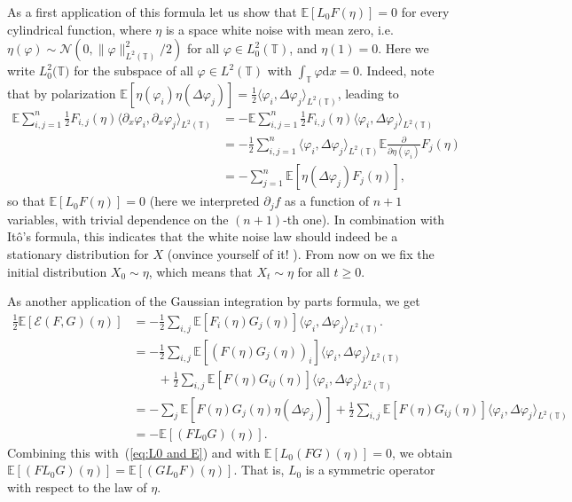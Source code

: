 \documentclass[a4paper,11pt]{article}
\newcommand{\mathd}{\mathrm{d}}
\begin{document}
As a first application of this formula let us show that $\mathbb{E} [L_0 F
(\eta)] = 0$ for every cylindrical function, where $\eta$ is a space white
noise with mean zero, i.e. $\eta (\varphi) \sim \mathcal{N} (0, \| \varphi \|_{L^2 (\mathbb{T})}^2 / 2)$ for all $\varphi \in L^2_0(\mathbb{T})$, and $\eta(1) = 0$. Here we write $L^2_0(\mathbb{T)}$ for the subspace of all $\varphi \in L^2(\mathbb{T})$ with $\int_{\mathbb{T}} \varphi \mathd x = 0$. Indeed, note that by polarization $\mathbb{E} [\eta (\varphi_i) \eta (\Delta
\varphi_j)] = \frac{1}{2} \langle \varphi_i, \Delta \varphi_j \rangle_{L^2
(\mathbb{T})}$, leading to
\begin{align*}
   \mathbb{E} \sum_{i, j = 1}^n \frac{1}{2} F_{i, j} (\eta) \langle \partial_x \varphi_i, \partial_x \varphi_j \rangle_{L^2 (\mathbb{T})} &= -\mathbb{E} \sum_{i, j = 1}^n \frac{1}{2} F_{i, j} (\eta) \langle \varphi_i, \Delta \varphi_j \rangle_{L^2 (\mathbb{T})} \\
   & = - \frac{1}{2} \sum_{i, j = 1}^n \langle \varphi_i, \Delta \varphi_j \rangle_{L^2 (\mathbb{T})} \mathbb{E} \frac{\partial}{\partial \eta (\varphi_i)} F_j (\eta) \\
   & = - \sum_{j = 1}^n \mathbb{E} [\eta (\Delta \varphi_j) F_j (\eta)],
\end{align*}
so that $\mathbb{E} [L_0 F (\eta)] = 0$ (here we interpreted $\partial_j f$ as a function of $n+1$ variables, with trivial dependence on the $(n+1)$-th one). In combination with It{\^o}'s
formula, this indicates that the white noise law should indeed be a stationary
distribution for $X$ (onvince yourself of it! ). From now on we fix the initial distribution
$X_0 \sim \eta$, which means that $X_t \sim \eta$ for all $t \geqslant 0$.

As another application of the Gaussian integration by parts formula, we get
\begin{align*}
  \frac{1}{2} \mathbb{E} [\mathcal{E} (F, G) (\eta)] & = - \frac{1}{2} \sum_{i, j} \mathbb{E} [F_i (\eta) G_j (\eta)] \langle \varphi_i, \Delta \varphi_j \rangle_{L^2 (\mathbb{T})} . \\
   & = - \frac{1}{2} \sum_{i, j} \mathbb{E} [(F (\eta) G_j (\eta))_i] \langle \varphi_i, \Delta \varphi_j \rangle_{L^2 (\mathbb{T})} \\
   &\qquad + \frac{1}{2}  \sum_{i, j} \mathbb{E} [F (\eta) G_{i j} (\eta)] \langle \varphi_i, \Delta \varphi_j \rangle_{L^2 (\mathbb{T})} \\
   & = - \sum_j \mathbb{E} [F (\eta) G_j (\eta) \eta (\Delta \varphi_j)] + \frac{1}{2} \sum_{i, j} \mathbb{E} [F (\eta) G_{i j} (\eta)] \langle \varphi_i, \Delta \varphi_j \rangle_{L^2 (\mathbb{T})} \\
   & = -\mathbb{E} [(FL_0 G) (\eta)].
\end{align*}
Combining this with~(\ref{eq:L0 and E}) and with $\mathbb{E} [L_0 (F G)
(\eta)] = 0$, we obtain $\mathbb{E} [(FL_0 G) (\eta)] =\mathbb{E} [(GL_0 F)
(\eta)]$. That is, $L_0$ is a symmetric operator with respect to the law of
$\eta$.
\end{document}
